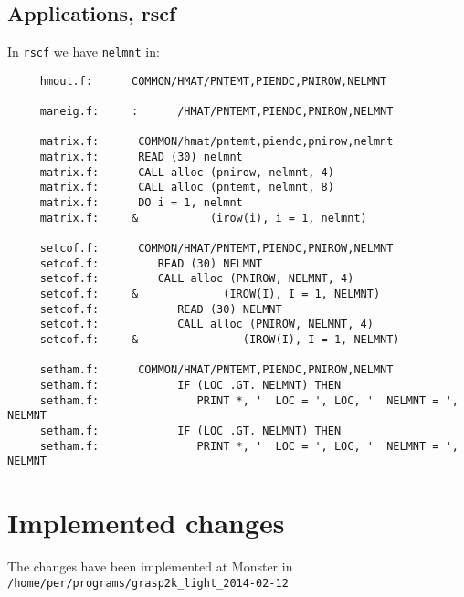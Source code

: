 \documentclass[a4paper,titlepage]{article}
\begin{document}
\subsection*{Applications, rscf}
In \verb+rscf+ we have \verb+nelmnt+  in:
\begin{verbatim}
     hmout.f:      COMMON/HMAT/PNTEMT,PIENDC,PNIROW,NELMNT
		
     maneig.f:     :      /HMAT/PNTEMT,PIENDC,PNIROW,NELMNT
		
     matrix.f:      COMMON/hmat/pntemt,piendc,pnirow,nelmnt
     matrix.f:      READ (30) nelmnt
     matrix.f:      CALL alloc (pnirow, nelmnt, 4)
     matrix.f:      CALL alloc (pntemt, nelmnt, 8)
     matrix.f:      DO i = 1, nelmnt
     matrix.f:     &           (irow(i), i = 1, nelmnt)
		
     setcof.f:      COMMON/HMAT/PNTEMT,PIENDC,PNIROW,NELMNT
     setcof.f:         READ (30) NELMNT
     setcof.f:         CALL alloc (PNIROW, NELMNT, 4)
     setcof.f:     &             (IROW(I), I = 1, NELMNT)
     setcof.f:            READ (30) NELMNT
     setcof.f:            CALL alloc (PNIROW, NELMNT, 4)
     setcof.f:     &                (IROW(I), I = 1, NELMNT)
		
     setham.f:      COMMON/HMAT/PNTEMT,PIENDC,PNIROW,NELMNT
     setham.f:            IF (LOC .GT. NELMNT) THEN
     setham.f:               PRINT *, '  LOC = ', LOC, '  NELMNT = ', NELMNT
     setham.f:            IF (LOC .GT. NELMNT) THEN
     setham.f:               PRINT *, '  LOC = ', LOC, '  NELMNT = ', NELMNT
\end{verbatim}
\section{Implemented changes}
The changes have been implemented at Monster in \verb+/home/per/programs/grasp2k_light_2014-02-12+
\end{document}
